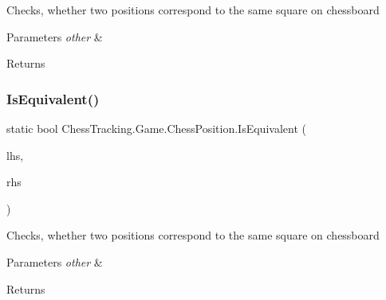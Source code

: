 Checks, whether two positions correspond to the same square on chessboard 


\begin{DoxyParams}{Parameters}
{\em other} & \\
\hline
\end{DoxyParams}
\begin{DoxyReturn}{Returns}

\end{DoxyReturn}
\mbox{\label{class_chess_tracking_1_1_game_1_1_chess_position_ac4f8302f35f751eba3c9baa8a3ec43d0}} 
\subsubsection{\texorpdfstring{IsEquivalent()}{IsEquivalent()}\hspace{0.1cm}{\footnotesize\ttfamily [2/2]}}
{\footnotesize\ttfamily static bool Chess\+Tracking.\+Game.\+Chess\+Position.\+Is\+Equivalent (\begin{DoxyParamCaption}\item[{\mbox{\hyperlink{class_chess_tracking_1_1_game_1_1_chess_position}{Chess\+Position}}}]{lhs,  }\item[{\mbox{\hyperlink{class_chess_tracking_1_1_game_1_1_chess_position}{Chess\+Position}}}]{rhs }\end{DoxyParamCaption})\hspace{0.3cm}{\ttfamily [static]}}



Checks, whether two positions correspond to the same square on chessboard 


\begin{DoxyParams}{Parameters}
{\em other} & \\
\hline
\end{DoxyParams}
\begin{DoxyReturn}{Returns}

\end{DoxyReturn}
\mbox{\label{class_chess_tracking_1_1_game_1_1_chess_position_ad09d6fdc1fdd5c5652deaea5c246f0b9}} 
